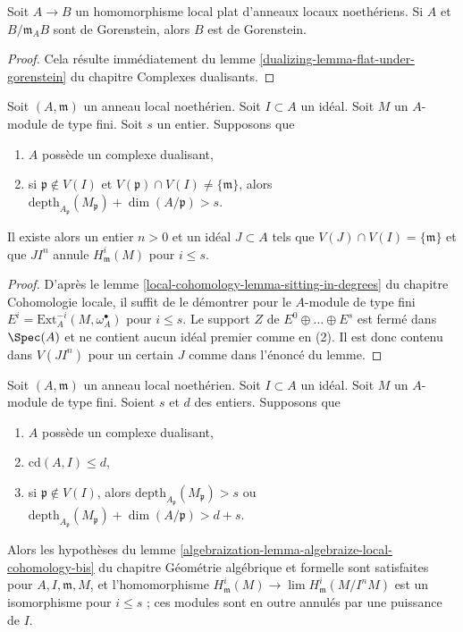\begin{lemma}
\label{lemma-flat-over-gorenstein-gorenstein-fibre}
Soit $A \to B$ un homomorphisme local plat d'anneaux locaux noethériens.
Si $A$ et $B/\mathfrak m_A B$ sont de Gorenstein, alors $B$ est de Gorenstein.
\end{lemma}

\begin{proof}
Cela résulte immédiatement du lemme
\ref{dualizing-lemma-flat-under-gorenstein} du chapitre Complexes dualisants.
\end{proof}

\begin{lemma}
\label{lemma-kill-local}
Soit $(A, \mathfrak m)$ un anneau local noethérien.
Soit $I \subset A$ un idéal. Soit $M$ un $A$-module de type fini.
Soit $s$ un entier. Supposons que
\begin{enumerate}
\item $A$ possède un complexe dualisant,
\item si $\mathfrak p \not \in V(I)$ et
$V(\mathfrak p) \cap V(I) \not = \{\mathfrak m\}$, alors
$\text{depth}_{A_\mathfrak p}(M_\mathfrak p) + \dim(A/\mathfrak p) > s$.
\end{enumerate}
Il existe alors un entier $n > 0$ et un idéal $J \subset A$
tels que $V(J) \cap V(I) = \{\mathfrak m\}$ et que $JI^n$ annule
$H^i_\mathfrak m(M)$ pour $i \leq s$.
\end{lemma}

\begin{proof}
D'après le lemme \ref{local-cohomology-lemma-sitting-in-degrees}
du chapitre Cohomologie locale, il suffit de le démontrer pour le $A$-module de type fini
$E^i = \text{Ext}^{-i}_A(M, \omega_A^\bullet)$
pour $i \leq s$. Le support $Z$ de $E^0 \oplus \ldots \oplus E^s$
est fermé dans $\Spec(A)$ et ne contient aucun idéal premier comme en (2).
Il est donc contenu dans $V(JI^n)$ pour un certain $J$ comme dans
l'énoncé du lemme.
\end{proof}

\begin{lemma}
\label{lemma-algebraize-local-cohomology-bis-bis}
Soit $(A, \mathfrak m)$ un anneau local noethérien.
Soit $I \subset A$ un idéal. Soit $M$ un $A$-module de type fini.
Soient $s$ et $d$ des entiers. Supposons que
\begin{enumerate}
\item[(a)] $A$ possède un complexe dualisant,
\item[(b)] $\text{cd}(A, I) \leq d$,
\item[(c)] si $\mathfrak p \not \in V(I)$, alors
$\text{depth}_{A_\mathfrak p}(M_\mathfrak p) > s$ ou
$\text{depth}_{A_\mathfrak p}(M_\mathfrak p) + \dim(A/\mathfrak p) > d + s$.
\end{enumerate}
Alors les hypothèses du lemme
\ref{algebraization-lemma-algebraize-local-cohomology-bis}
du chapitre Géométrie algébrique et formelle sont satisfaites
pour $A, I, \mathfrak m, M$, et l'homomorphisme
$H^i_\mathfrak m(M) \to \lim H^i_\mathfrak m(M/I^nM)$
est un isomorphisme pour $i \leq s$ ; ces modules sont en outre
annulés par une puissance de $I$.
\end{lemma}

